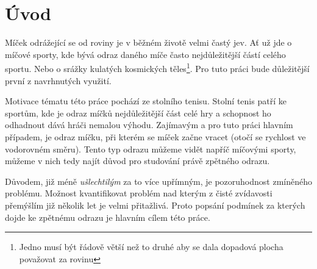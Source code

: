 \chapter*{Úvod}

Míček odrážející se od roviny je v běžném životě velmi častý jev. Ať už jde o
míčové sporty, kde bývá odraz daného míče často nejdůležitější částí celého
sportu. Nebo o srážky kulatých kosmických
těles\footnote{Jedno musí být řádově větší než to druhé aby se dala dopadová plocha
považovat za rovinu}. Pro tuto práci bude důležitější první z navrhnutých
využití. 

Motivace tématu této práce pochází ze stolního tenisu. Stolní tenis patří ke
sportům, kde je odraz míčků nejdůležitější část celé hry a schopnost ho
odhadnout dává hráči nemalou výhodu. Zajímavým a pro tuto práci hlavním
případem, je odraz míčku, při kterém se míček začne vracet (otočí se rychlost ve
vodorovném směru). Tento typ odrazu můžeme vidět napříč míčovými sporty, můžeme
v nich tedy najít důvod pro studování právě zpětného odrazu. 

Důvodem, již méně \emph{ušlechtilým} za to více upřímným, je pozoruhodnost
zmíněného problému. Možnost kvantifikovat problém nad kterým z čisté zvídavosti
přemýšlím již několik let je velmi přitažlivá. Proto popsání podmínek za
kterých dojde ke zpětnému odrazu je hlavním cílem této práce.
